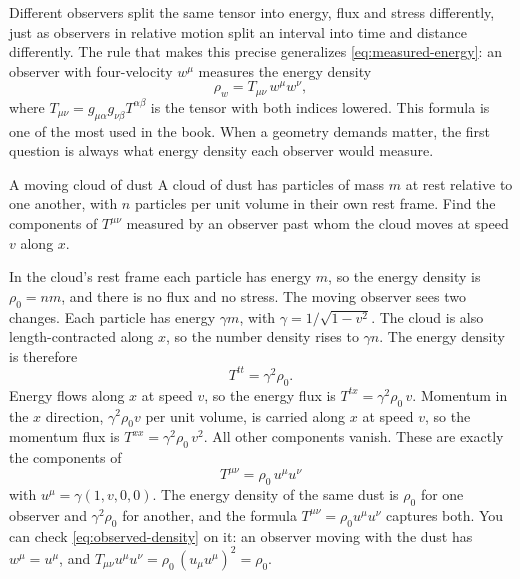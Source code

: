 Different observers split the same tensor into energy, flux and stress
differently, just as observers in relative motion split an interval into time
and distance differently. The rule that makes this precise generalizes
\cref{eq:measured-energy}: an observer with four-velocity $w^{\mu}$ measures the
energy density
\begin{equation}
  \rho_{w} = T_{\mu\nu}\,w^{\mu}w^{\nu},
  \label{eq:observed-density}
\end{equation}
where $T_{\mu\nu} = g_{\mu\alpha}g_{\nu\beta}T^{\alpha\beta}$ is the tensor with
both indices lowered. This formula is one of the most used in the book. When a
geometry demands matter, the first question is always what energy density
each observer would measure.

\begin{example}{A moving cloud of dust}\label{ex:dust}
A cloud of dust has particles of mass $m$ at rest relative to one another, with
$n$ particles per unit volume in their own rest frame. Find the components of
$T^{\mu\nu}$ measured by an observer past whom the cloud moves at speed $v$
along $x$.

\solution In the cloud's rest frame each particle has energy $m$, so the energy
density is $\rho_{0} = nm$, and there is no flux and no stress. The moving
observer sees two changes. Each particle has energy $\gamma m$, with
$\gamma = 1/\sqrt{1-v^{2}}$. The cloud is also length-contracted along $x$, so
the number density rises to $\gamma n$. The energy density is therefore
\begin{equation*}
  T^{tt} = \gamma^{2}\rho_{0}.
\end{equation*}
Energy flows along $x$ at speed $v$, so the energy flux is
$T^{tx} = \gamma^{2}\rho_{0}\,v$. Momentum in the $x$ direction,
$\gamma^{2}\rho_{0}v$ per unit volume, is carried along $x$ at speed $v$, so the
momentum flux is $T^{xx} = \gamma^{2}\rho_{0}\,v^{2}$. All other components
vanish. These are exactly the components of
\begin{equation}
  T^{\mu\nu} = \rho_{0}\,u^{\mu}u^{\nu}
  \label{eq:dust}
\end{equation}
with $u^{\mu} = \gamma(1, v, 0, 0)$.
\discussion The energy density of the same dust is $\rho_{0}$ for one observer
and $\gamma^{2}\rho_{0}$ for another, and the formula $T^{\mu\nu} = \rho_{0}u^{\mu}u^{\nu}$
captures both. You can check \cref{eq:observed-density} on it: an observer
moving with the dust has $w^{\mu} = u^{\mu}$, and
$T_{\mu\nu}u^{\mu}u^{\nu} = \rho_{0}\,(u_{\mu}u^{\mu})^{2} = \rho_{0}$.
\end{example}

